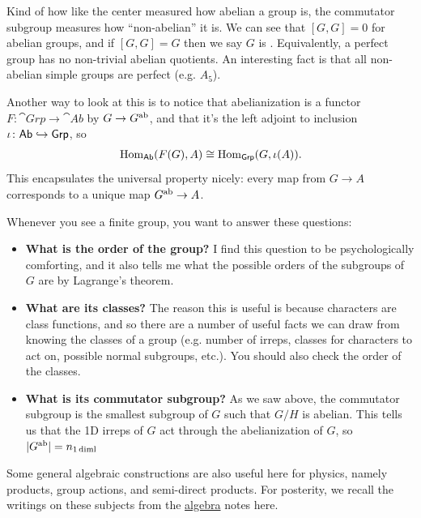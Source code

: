 \documentclass[11pt]{article}
\begin{document}
Kind of how like the center measured how abelian a group is, the commutator
subgroup measures how ``non-abelian'' it is. We can see that $[G, G] = 0$
for abelian groups, and if $[G, G] = G$ then we say $G$ is .
Equivalently, a perfect group has no non-trivial abelian quotients. An interesting
fact is that all non-abelian simple groups are perfect (e.g. $A_5$).

Another way to look at this is to notice that abelianization is a
functor $F \colon \cat{Grp} \to \cat{Ab}$ by $G \to G^{\rm ab}$, 
and that it's the left adjoint to inclusion $\iota \colon \text{\sffamily{Ab}} \hookrightarrow \text{\sffamily{Grp}}$, so
\begin{align*}
    \operatorname{Hom}_{\text{\sffamily{Ab}}}(F(G), A) \cong \operatorname{Hom}_{\text{\sffamily{Grp}}}(G, \iota(A)).
\end{align*}
This encapsulates the universal property nicely: every map from
$G \to A$ corresponds to a unique map $G^{\rm ab} \to A$. 

\begin{iidea}
    Whenever you see a finite group, you want to answer these questions:
    \begin{itemize}
        \item \textbf{What is the order of the group?} I find this question to be 
        psychologically comforting, and it also tells me what the possible 
        orders of the subgroups of $G$ are by Lagrange's theorem.
        \item \textbf{What are its classes?} The reason this is useful is because
        characters are class functions, and so there are a number of useful facts we can
        draw from knowing the classes of a group (e.g. number of irreps,
        classes for characters to act on, possible normal subgroups, etc.).
        You should also check the order of the classes.
        \item \textbf{What is its commutator subgroup?} As we saw above, the commutator
        subgroup is the smallest subgroup of $G$ such that $G/H$ is abelian.
        This tells us that the 1D irreps of $G$ act through the abelianization 
        of $G$, so $|G^{\rm ab}| = n_{1 \, \rm{diml}}$
    \end{itemize}
\end{iidea}

Some general algebraic constructions are also useful here
for physics, namely products, group actions, and semi-direct products.
For posterity, we recall the writings on these subjects from the 
\href{https://github.com/will-lancer/notes/blob/main/Mathematics/Algebra/Algebra.pdf}{algebra} 
notes here.
\end{document}
